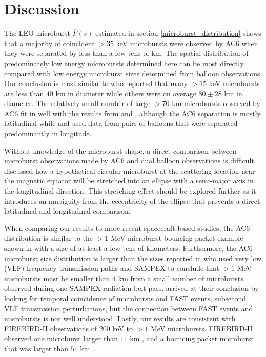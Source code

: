 \documentclass[draft]{agujournal2019}
\begin{document}
\section{Discussion} \label{discussion}
The LEO microburst $\bar{F}(s)$ estimated in section \ref{microburst_distribution} shows that a majority of coincident $>35$ keV microbursts were observed by AC6 when they were separated by less than a few tens of km. The spatial distribution of predominately low energy microbursts determined here can be most directly compared with low energy microburst sizes determined from balloon observations. Our conclusion is most similar to  who reported that many $> 15$ keV microbursts are less than $40$ km in diameter while others were on average $80 \pm 28$ km in diameter. The relatively small number of large $> 70$ km microbursts observed by AC6 fit in well with the results from  and , although the AC6 separation is mostly latitudinal while  and  used data from pairs of balloons that were separated predominantly in longitude. 

Without knowledge of the microburst shape, a direct comparison between microburst observations made by AC6 and dual balloon observations is difficult.  discussed how a hypothetical circular microburst at the scattering location near the magnetic equator will be stretched into an ellipse with a semi-major axis in the longitudinal direction. This stretching effect should be explored further as it introduces an ambiguity from the eccentricity of the ellipse that prevents a direct latitudinal and longitudinal comparison.

When comparing our results to more recent spacecraft-based studies, the AC6 distribution is similar to the $> 1$ MeV microburst bouncing packet example shown in  with a size of at least a few tens of kilometers. Furthermore, the AC6 microburst size distribution is larger than the sizes reported in  who used very low (VLF) frequency transmission paths and SAMPEX to conclude that $>1$ MeV microbursts must be smaller than 4 km from a small number of microbursts observed during one SAMPEX radiation belt pass.  arrived at their conclusion by looking for temporal coincidence of microbursts and FAST events, subsecond VLF transmission perturbations, but the connection between FAST events and microbursts is not well understood. Lastly, our results are consistent with FIREBIRD-II observations of $200$ keV to $>1$ MeV microbursts. FIREBIRD-II observed one microburst larger than $11$ km \cite{Crew2016}, and a bouncing packet microburst that was larger than $51$ km \cite{Shumko2018a}.
\end{document}
